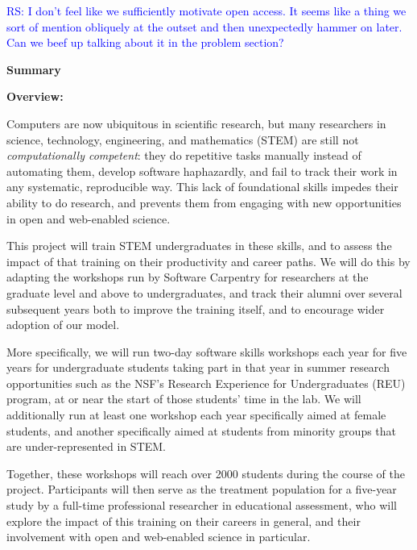 \documentclass{proposalnsf}
\newlength{\up}
\newcommand{\comment}[1]{\textcolor{blue}{ #1 }}
\begin{document}
\comment{RS: I don't feel like we sufficiently motivate open access. It seems like a thing we sort of mention obliquely at the outset and then unexpectedly hammer on later. Can we beef up talking about it in the problem section?}

\newpage


\begin{center}

\large\textbf{Summary}

\end{center}

\textbf{Overview:}

Computers are now ubiquitous in scientific research, but many
researchers in science, technology, engineering, and mathematics
(STEM) are still not \emph{computationally competent}: they do
repetitive tasks manually instead of automating them, develop software
haphazardly, and fail to track their work in any systematic,
reproducible way.  This lack of foundational skills impedes their
ability to do research, and prevents them from engaging with new
opportunities in open and web-enabled science.

This project will train STEM undergraduates in these skills, and to
assess the impact of that training on their productivity and career
paths.  We will do this by adapting the workshops run by Software
Carpentry for researchers at the graduate level and above to
undergraduates, and track their alumni over several subsequent years
both to improve the training itself, and to encourage wider adoption
of our model.

More specifically, we will run two-day software skills workshops each
year for five years for undergraduate students taking part in that
year in summer research opportunities such as the NSF's Research
Experience for Undergraduates (REU) program, at or near the start of
those students' time in the lab.  We will additionally run at least
one workshop each year specifically aimed at female students, and
another specifically aimed at students from minority groups that are
under-represented in STEM.

Together, these workshops will reach over 2000 students during the
course of the project.  Participants will then serve as the treatment
population for a five-year study by a full-time professional
researcher in educational assessment, who will explore the impact of
this training on their careers in general, and their involvement with
open and web-enabled science in particular.
\end{document}

